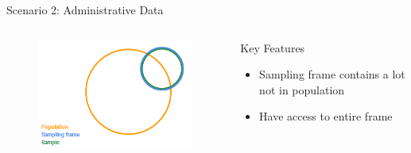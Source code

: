 \documentclass[aspectratio=169]{../latex_main/tntbeamer}  %
\begin{document}
	
	\begin{frame}{Scenario 2: Administrative Data}
	    \begin{columns}
	        \begin{column}{.4\textwidth}
	           \begin{figure}
	               \includegraphics[scale=.8]{Bild4}
	           \end{figure}
	        \end{column}
	        
	        \begin{column}{.4\textwidth}
	            Key Features
                \begin{itemize}
                    \item Sampling frame contains a lot not in population
                    \item Have access to entire frame
                \end{itemize}
	        \end{column}
	        
	    \end{columns}
	    
	\end{frame}
	
\end{document}
